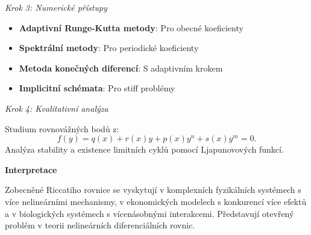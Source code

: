 \begin{example}
\noindent\textit{Krok 3: Numerické přístupy}

\begin{itemize}
\item \textbf{Adaptivní Runge-Kutta metody}: Pro obecné koeficienty
\item \textbf{Spektrální metody}: Pro periodické koeficienty
\item \textbf{Metoda konečných diferencí}: S adaptivním krokem
\item \textbf{Implicitní schémata}: Pro stiff problémy
\end{itemize}

\noindent\textit{Krok 4: Kvalitativní analýza}

Studium rovnovážných bodů z:
\[
f(y) = q(x) + r(x)y + p(x)y^n + s(x)y^m = 0.
\]
Analýza stability a existence limitních cyklů pomocí Ljapunovových funkcí.

\vspace{1.5\baselineskip}

\noindent\textbf{Interpretace}

Zobecněné Riccatiho rovnice se vyskytují v komplexních fyzikálních systémech 
s více nelineárními mechanismy, v ekonomických modelech s konkurencí více efektů 
a v biologických systémech s vícenásobnými interakcemi. Představují otevřený 
problém v teorii nelineárních diferenciálních rovnic.

\end{example}

\vspace{2\baselineskip}

